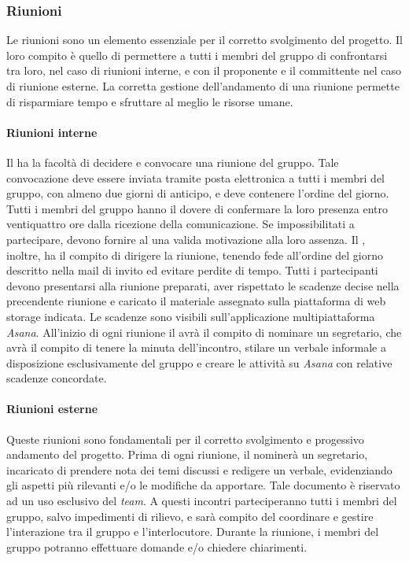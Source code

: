 		\subsubsection{Riunioni}
		Le riunioni sono un elemento essenziale per il corretto svolgimento del progetto. Il loro compito è quello di permettere a tutti i membri del gruppo di confrontarsi tra loro, nel caso di riunioni interne, e con il proponente e il committente nel caso di riunione esterne. La corretta gestione dell'andamento di una riunione permette di risparmiare tempo e sfruttare al meglio le risorse umane.
		
			\paragraph{Riunioni interne}
			Il \textit{\RdP} ha la facoltà di decidere e convocare una riunione del gruppo. Tale convocazione deve essere inviata tramite posta elettronica a tutti i membri del gruppo, con almeno due giorni di anticipo, e deve contenere l’ordine del giorno. Tutti i membri del gruppo hanno il dovere di confermare la loro presenza entro ventiquattro ore dalla ricezione della comunicazione. Se impossibilitati a partecipare, devono fornire al \textit{\RdP} una valida motivazione alla loro assenza. Il \textit{\RdP}, inoltre, ha il compito di dirigere la riunione, tenendo fede all’ordine del giorno descritto nella mail di invito ed evitare perdite di tempo. Tutti i partecipanti devono presentarsi alla riunione preparati, aver rispettato le scadenze decise nella precendente riunione e caricato il materiale assegnato sulla piattaforma di web storage indicata. Le scadenze sono visibili sull'applicazione multipiattaforma \textit{Asana}.
			All’inizio di ogni riunione il \textit{\RdP} avrà il compito di nominare un segretario, che avrà il compito di tenere la minuta dell’incontro, stilare un verbale informale a disposizione esclusivamente del gruppo e creare le attività su \textit{Asana} con relative scadenze concordate.  
		
			\paragraph{Riunioni esterne}
			Queste riunioni sono fondamentali per il corretto svolgimento e progessivo andamento del progetto. Prima di ogni riunione, il \textit{\RdP} nominerà un segretario, incaricato di prendere nota dei temi discussi e redigere un verbale, evidenziando gli aspetti più rilevanti e/o le modifiche da apportare. Tale documento è riservato ad un uso esclusivo del \textit{team}.
			A questi incontri parteciperanno tutti i membri del gruppo, salvo impedimenti di rilievo, e sarà compito del \textit{\RdP} coordinare e gestire l’interazione tra il gruppo e l’interlocutore. Durante la riunione, i membri del gruppo potranno effettuare domande e/o chiedere chiarimenti. 
			
